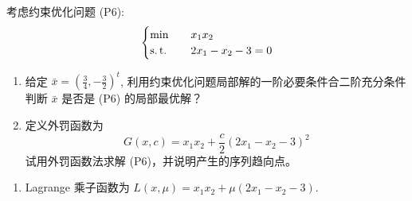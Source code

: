 \begin{Problem}
    考虑约束优化问题 (P6):
    \[
        \begin{cases}
            \min \quad &x_1x_2\\
            \operatorname{s.t.} \quad &2x_1 - x_2 - 3 = 0
        \end{cases}
    \]
    \begin{enumerate}[label=(\arabic*)]
        \item 给定 $\bar{x} = \left(\frac{3}{4}, -\frac{3}{2}\right)^t$, 利用约束优化问题局部解的一阶必要条件合二阶充分条件判断 $\bar{x}$ 是否是 (P6) 的局部最优解？
        \item 定义外罚函数为
        \[
            G(x, c) = x_1x_2 + \dfrac{c}{2}\left(2x_1 - x_2 - 3\right)^2
        \]
        试用外罚函数法求解 (P6)，并说明产生的序列趋向点。
    \end{enumerate}

    \Answer
    \leavevmode
    \begin{enumerate}[label=(\arabic*)]
        \item Lagrange 乘子函数为 $L(x, \mu) = x_1x_2 + \mu(2x_1 - x_2 - 3)$.
        

\end{enumerate}
\end{Problem}
